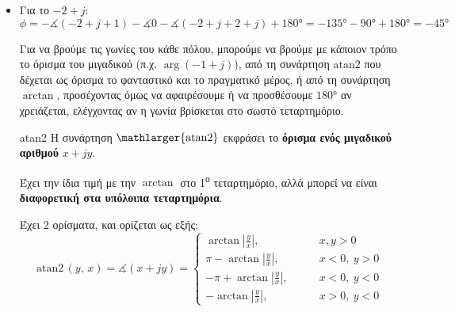 \documentclass[11pt,a4paper,notitlepage,fleqn,final]{article}
\begin{document}
\begin{exercise}
\begin{itemize}
		\begin{itemize}
			\item Για το \( -2+j \):
			\[
			\phi = -\measuredangle(-2+j+1) - \measuredangle 0 - \measuredangle(-2+j+2+j) + \ang{180}
			= -\ang{135} - \ang{90} + \ang{180} = -\ang{45}
			\]
			
			Για να βρούμε τις γωνίες του κάθε πόλου, μπορούμε να βρούμε με κάποιον τρόπο το
			όρισμα του μιγαδικού (π.χ. \( \arg(-1+j) \)), από τη συνάρτηση \( \mathrm{atan2} \)
			που δέχεται ως όρισμα το φανταστικό και το πραγματικό μέρος, ή από τη συνάρτηση
			\( \arctan \), προσέχοντας όμως να αφαιρέσουμε ή να προσθέσουμε \( \ang{180} \) αν
			χρειάζεται, ελέγχοντας αν η γωνία βρίσκεται στο σωστό τεταρτημόριο.
			
			\begin{attnbox}{atan2}
				Η συνάρτηση \( \displaystyle \mathlarger{\mathrm{atan2}} \) εκφράσει
				το \textbf{όρισμα ενός μιγαδικού αριθμού}
				\( x+jy \).
				
				Έχει την ίδια τιμή με την \( \arctan \) στο 1\textsuperscript{ο} τεταρτημόριο, αλλά
				μπορεί να είναι \textbf{διαφορετική στα υπόλοιπα τεταρτημόρια}.
				
				Έχει 2 ορίσματα, και ορίζεται ως εξής:
				\[
				\mathrm{atan2}\,(y,\, x)= \measuredangle(x+jy) = \begin{cases}
				\arctan\left|\frac{y}{x}\right|, \qquad & x,y>0 \\
				\pi - \arctan\left|\frac{y}{x}\right|, \qquad & x<0,\ y>0 \\
				-\pi + \arctan\left|\frac{y}{x}\right|, \qquad & x<0,\ y<0 \\
				-\arctan\left|\frac{y}{x}\right|, \qquad & x>0,\ y<0
				\end{cases}
				\]
				
				\begin{center}
\end{center}
\end{attnbox}
\end{itemize}
\end{itemize}
\end{exercise}
\end{document}
